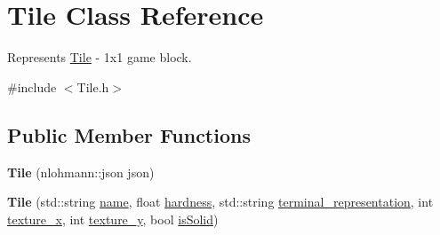 \hypertarget{classTile}{\section{Tile Class Reference}
\label{classTile}
}


Represents \hyperlink{classTile}{Tile} -\/ 1x1 game block.  




{\ttfamily \#include $<$Tile.\-h$>$}

\subsection*{Public Member Functions}
\begin{DoxyCompactItemize}
\item 
\hypertarget{classTile_a135790fef385f3021dccf9dde464432c}{{\bfseries Tile} (nlohmann\-::json json)}\label{classTile_a135790fef385f3021dccf9dde464432c}

\item 
\hypertarget{classTile_a0cd19571a292b010a988ad96769a675b}{{\bfseries Tile} (std\-::string \hyperlink{classTile_aa5408d0f0f4a60f25796f651db2f84ac}{name}, float \hyperlink{classTile_accd68364f51cf745c5c95717a164b2e9}{hardness}, std\-::string \hyperlink{classTile_a4792f343c63f2b7c1bf1a7321ba60206}{terminal\-\_\-representation}, int \hyperlink{classTile_ac1b8010b027d438ee826af235dc00fe1}{texture\-\_\-x}, int \hyperlink{classTile_addde9f80a365eae65b1f4bc156f18722}{texture\-\_\-y}, bool \hyperlink{classTile_a3a32e61b42ec4bc8bb1d924261c19403}{is\-Solid})}\label{classTile_a0cd19571a292b010a988ad96769a675b}

\end{DoxyCompactItemize}

